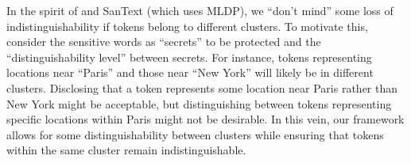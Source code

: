 In the  spirit of \cite{chatzikokolakis2013broadening} and SanText (which uses MLDP), we ``don’t mind'' some loss of indistinguishability if tokens belong to different clusters. To motivate this, consider the sensitive words as ``secrets'' to be protected and the ``distinguishability level'' between secrets. For instance, tokens representing locations near ``Paris''  and those near ``New York'' will likely be in different clusters. Disclosing that a token represents some location near Paris rather than  New York might be acceptable, but distinguishing between tokens representing specific locations within Paris might not be desirable. 
In this vein, our framework allows for some distinguishability between clusters while ensuring that tokens within the same cluster remain indistinguishable. 




